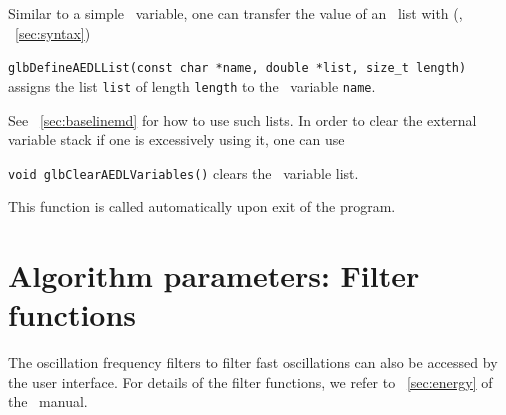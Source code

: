 Similar to a simple \AEDL\ variable, one can transfer the value of an
\AEDL\ list with (\cf, \Sec~\ref{sec:syntax})
\begin{function}
{\tt glbDefineAEDLList(const char *name, double *list, size\_t length)} assigns the list {\tt list}
of length {\tt length} to the \AEDL\ variable {\tt name}.
\end{function}
See \Sec~\ref{sec:baselinemd} for how to use such lists.
%
In order to clear the external variable stack if one is
excessively using it, one can use
\begin{function}
{\tt void glbClearAEDLVariables()}
clears the \AEDL\ variable list.
\end{function}
This function is called automatically upon exit of the program.

\section{Algorithm parameters: Filter functions}

The oscillation frequency filters to filter fast oscillations
can also be accessed by the user interface. For details of
the filter functions, we refer to \Sec~\ref{sec:energy} of
the \AEDL\ manual.

